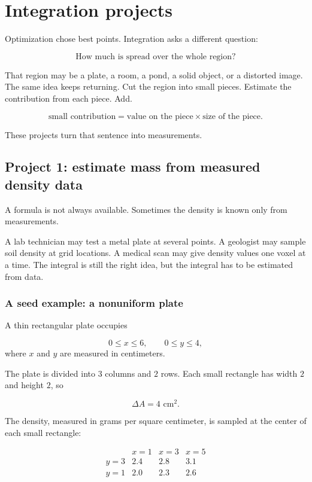 \section{Integration projects}
\label{sec:20.3}

Optimization chose best points.  Integration asks a different question:

\[
    \text{How much is spread over the whole region?}
\]

That region may be a plate, a room, a pond, a solid object, or a distorted image.  The
same idea keeps returning.  Cut the region into small pieces.  Estimate the contribution
from each piece.  Add.

\[
    \text{small contribution}
    =
    \text{value on the piece}\times \text{size of the piece}.
\]

These projects turn that sentence into measurements.

\subsection{Project 1: estimate mass from measured density data}

A formula is not always available.  Sometimes the density is known only from
measurements.

A lab technician may test a metal plate at several points.  A geologist may sample soil
density at grid locations.  A medical scan may give density values one voxel at a time.
The integral is still the right idea, but the integral has to be estimated from data.

\subsubsection*{A seed example: a nonuniform plate}

A thin rectangular plate occupies

\[
    0\le x\le6,
    \qquad
    0\le y\le4,
\]
where \(x\) and \(y\) are measured in centimeters.

The plate is divided into \(3\) columns and \(2\) rows.  Each small rectangle has width
\(2\) and height \(2\), so

\[
    \Delta A=4\text{ cm}^2.
\]

The density, measured in grams per square centimeter, is sampled at the center of each
small rectangle:

\[
\begin{array}{c|ccc}
 & x=1 & x=3 & x=5 \\ \hline
y=3 & 2.4 & 2.8 & 3.1\\
y=1 & 2.0 & 2.3 & 2.6
\end{array}
\]

